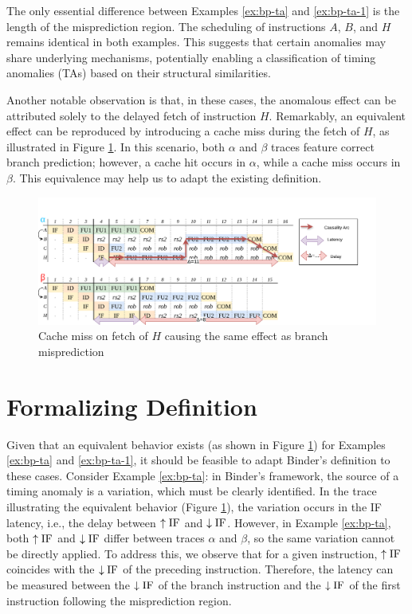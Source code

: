 The only essential difference between Examples \ref{ex:bp-ta} and \ref{ex:bp-ta-1} is the length of the misprediction region. The scheduling of instructions $A$, $B$, and $H$ remains identical in both examples. This suggests that certain anomalies may share underlying mechanisms, potentially enabling a classification of timing anomalies (TAs) based on their structural similarities.

Another notable observation is that, in these cases, the anomalous effect can be attributed solely to the delayed fetch of instruction $H$. Remarkably, an equivalent effect can be reproduced by introducing a cache miss during the fetch of $H$, as illustrated in Figure \ref{fig:equiv-to-bp-ta}. In this scenario, both $\alpha$ and $\beta$ traces feature correct branch prediction; however, a cache hit occurs in $\alpha$, while a cache miss occurs in $\beta$. This equivalence may help us to adapt the existing definition.


\begin{figure}[H]
    \centering
    \includegraphics[width=\textwidth]{figures/equiv-trace.png}
    \caption{Cache miss on fetch of $H$ causing the same effect as branch misprediction}
    \label{fig:equiv-to-bp-ta}
\end{figure}

\section{Formalizing Definition}


Given that an equivalent behavior exists (as shown in Figure \ref{fig:equiv-to-bp-ta}) for Examples \ref{ex:bp-ta} and \ref{ex:bp-ta-1}, it should be feasible to adapt Binder's definition to these cases. Consider Example \ref{ex:bp-ta}: in Binder's framework, the source of a timing anomaly is a variation, which must be clearly identified. In the trace illustrating the equivalent behavior (Figure \ref{fig:equiv-to-bp-ta}), the variation occurs in the IF latency, i.e., the delay between $\uparrow\mathrm{IF}$ and $\downarrow\mathrm{IF}$. However, in Example \ref{ex:bp-ta}, both $\uparrow\mathrm{IF}$ and $\downarrow\mathrm{IF}$ differ between traces $\alpha$ and $\beta$, so the same variation cannot be directly applied. To address this, we observe that for a given instruction, $\uparrow\mathrm{IF}$ coincides with the $\downarrow\mathrm{IF}$ of the preceding instruction. Therefore, the latency can be measured between the $\downarrow\mathrm{IF}$ of the branch instruction and the $\downarrow\mathrm{IF}$ of the first instruction following the misprediction region.

